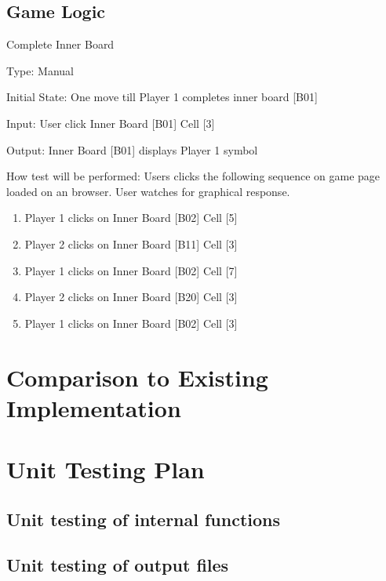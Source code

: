 \documentclass[12pt, titlepage]{article}
\begin{document}
\subsection{Game Logic}

\item{Complete Inner Board\\}

Type: Manual
					
Initial State: One move till Player 1 completes inner board [B01]
					
Input: User click Inner Board [B01] Cell [3] 
					
Output:  Inner Board [B01] displays Player 1 symbol
					
How test will be performed: Users clicks the following sequence on game page loaded on an browser. User watches for graphical response.
\begin{enumerate}
	\item Player 1 clicks on Inner Board [B02] Cell [5]
	\item Player 2 clicks on Inner Board [B11] Cell [3]
	\item Player 1 clicks on Inner Board [B02] Cell [7]
	\item Player 2 clicks on Inner Board [B20] Cell [3]
	\item Player 1 clicks on Inner Board [B02] Cell [3]
\end{enumerate}

	
\section{Comparison to Existing Implementation}	
				
\section{Unit Testing Plan}
		
\subsection{Unit testing of internal functions}
		
\subsection{Unit testing of output files}		




\end{document}
